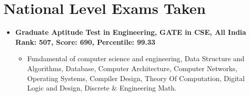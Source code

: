 \documentclass[10.8pt, a4paper]{extarticle}
\newcommand{\shorterSection}[1]{\vspace{-10pt}\section{#1}}
\begin{document}
\shorterSection{National Level Exams Taken}
\begin{itemize}
\item \textbf{Graduate Aptitude Test in Engineering, GATE in CSE, All India Rank: 507, Score: 690, Percentile: 99.33}
    \begin{itemize}
    \item Fundamental of computer science and engineering, Data Structure and Algorithms, Database, Computer Architecture, Computer Networks, Operating Systems, Compiler Design, Theory Of Computation, Digital Logic and Design, Discrete \& Engineering Math.  \href{https://drive.google.com/file/d/1IkVH0v_xUTgL83VHjq7N5oFpSjw99Zma/view?usp=drive_link}{}
    \end{itemize}
\vspace{4mm}
\end{itemize}
\vspace{4mm}
\end{document}
